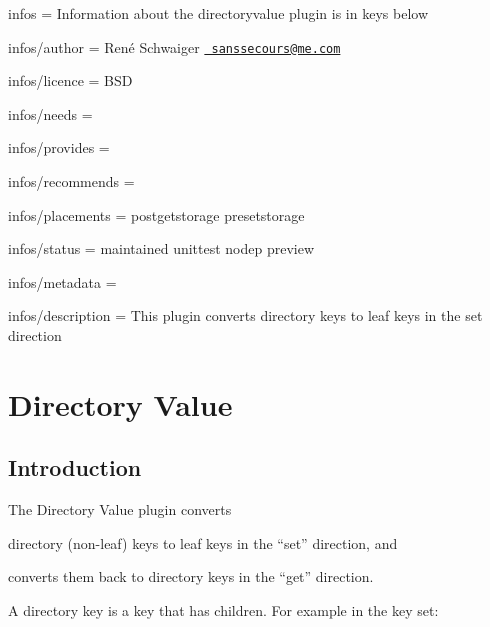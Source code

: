 
\begin{DoxyItemize}
\item infos = Information about the directoryvalue plugin is in keys below
\item infos/author = René Schwaiger \href{mailto:sanssecours@me.com}{\texttt{ sanssecours@me.\+com}}
\item infos/licence = B\+SD
\item infos/needs =
\item infos/provides =
\item infos/recommends =
\item infos/placements = postgetstorage presetstorage
\item infos/status = maintained unittest nodep preview
\item infos/metadata =
\item infos/description = This plugin converts directory keys to leaf keys in the set direction
\end{DoxyItemize}\hypertarget{autotoc_md181_src_plugins_directoryvalue_README_md}{}\section{Directory Value}\label{autotoc_md181_src_plugins_directoryvalue_README_md}
\hypertarget{autotoc_md181_autotoc_md182}{}\subsection{Introduction}\label{autotoc_md181_autotoc_md182}
The Directory Value plugin converts


\begin{DoxyEnumerate}
\item directory (non-\/leaf) keys to leaf keys in the “set” direction, and
\item converts them back to directory keys in the “get” direction.
\end{DoxyEnumerate}

A directory key is a key that has children. For example in the key set\+:


\begin{DoxyCode}{0}
\end{DoxyCode}



